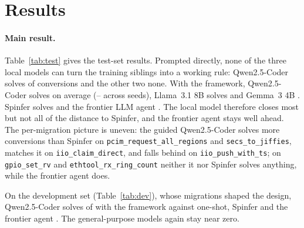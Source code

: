 \section{Results}
\label{sec:results}

\paragraph{Main result.} Table~\ref{tab:test} gives the test-set results. Prompted directly, none of the three local
models can turn the training siblings into a working rule: Qwen2.5-Coder solves \testQwenCoderOneShot{} of
\testBuildable{} conversions and the other two none. With the framework, Qwen2.5-Coder solves
\testQwenCoderFull{} on average (\testQwenCoderFullMin--\testQwenCoderFullMax{} across seeds), Llama~3.1 8B
solves \testLlamaFull{} and Gemma~3 4B \testGemmaFull. Spinfer solves \testSpinfer{} and the frontier LLM agent
\testFrontier. The local model therefore closes most but not all of the distance to Spinfer, and the frontier agent
stays well ahead. The per-migration picture is uneven: the guided Qwen2.5-Coder solves more conversions than
Spinfer on \texttt{pcim\_request\_all\_regions} and \texttt{secs\_to\_jiffies}, matches it on
\texttt{iio\_claim\_direct}, and falls behind on \texttt{iio\_push\_with\_ts}; on \texttt{gpio\_set\_rv} and
\texttt{ethtool\_rx\_ring\_count} neither it nor Spinfer solves anything, while the frontier agent does.

On the development set (Table~\ref{tab:dev}), whose migrations shaped the design, Qwen2.5-Coder solves
\devQwenCoderFull{} of \devBuildable{} with the framework against \devQwenCoderOneShot{} one-shot, Spinfer
\devSpinfer{} and the frontier agent \devFrontier. The general-purpose models again stay near zero.

\begin{table}[t]
\centering
\caption{Development set, same layout as Table~\ref{tab:test}. These migrations were used to design the framework,
so the numbers are optimistic.}
\label{tab:dev}
\footnotesize
\setlength{\tabcolsep}{4pt}

\end{table}

\begin{table}[t]
\centering
\caption{Ablation: conversions solved as components are added (mean over three seeds, [min--max]). Every
configuration is composed by stage~3; the last row adds the compile critic of stage~4.}
\label{tab:ablation}
\footnotesize
\setlength{\tabcolsep}{4pt}

\end{table}

